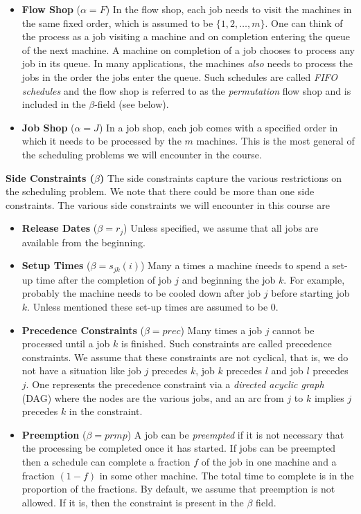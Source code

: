\documentclass[11pt]{article}
\def\ni{\noindent}
\begin{document}
\begin{itemize}
\item[]{\bf Flow Shop} ($\alpha = F$) In the flow shop, each job needs to visit the machines in the same fixed order, which is assumed to be $\{1,2,\ldots,m\}$. One can think of the process as a job visiting a machine and on completion entering the queue of the next machine. A machine on completion of a job chooses to process any job in its queue.
In many applications, the machines {\em also} needs to process the jobs in the order the jobs enter the queue. Such schedules  are called {\em FIFO schedules} and the flow shop is referred to as the {\em permutation} flow shop and is included in the $\beta$-field (see below).

\item[]{\bf Job Shop} ($\alpha = J$) In a job shop, each job comes with a specified order in which it needs to be processed by the $m$ machines. This is the most general of the scheduling problems we will encounter in the course.
\end{itemize} 

\ni
{\bf Side Constraints ($\beta$)} The side constraints capture the various restrictions on the scheduling problem. We note that there could be more than one side constraints. The various side constraints we will encounter in this course are
\begin{itemize}
\item[] {\bf Release Dates} ($\beta = r_j$) Unless specified, we assume that all jobs are available from the beginning.
\item[] {\bf Setup Times} ($\beta = s_{jk}(i)$) Many a times a machine $i$needs to spend a set-up time after the completion of job $j$ and beginning the job $k$. For example, probably the machine needs to be cooled down after job $j$ before starting job $k$. Unless mentioned these set-up times are assumed to be $0$.

\item[] {\bf Precedence Constraints} ($\beta = prec$) Many times a job $j$ cannot be processed until a job $k$ is finished.
Such constraints are called precedence constraints. We assume that these constraints are not cyclical, that is, we do not have a situation like job $j$ precedes $k$, job $k$ precedes $l$ and job $l$ precedes $j$. One represents the precedence constraint via a {\em directed acyclic graph} (DAG) where the nodes are the various jobs, and an arc from $j$ to $k$ implies $j$ precedes $k$ in the constraint.

\item[]{\bf Preemption} ($\beta = prmp$) A job can be {\em preempted} if it is not necessary that the processing be completed once it has started. If jobs can be preempted then a schedule can complete a fraction $f$ of the job in one machine and a fraction $(1-f)$ in some other machine. The total time to complete is in the proportion of the fractions. By default, we assume that preemption is not allowed. If it is, then the constraint is present in the $\beta$ field.
\end{itemize}
\end{document}

